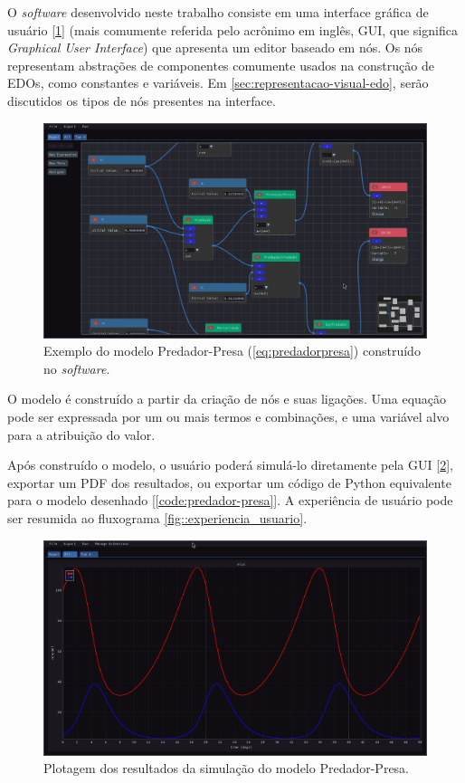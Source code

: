 \documentclass[
	12pt,				%
	openright,			%
	oneside,			%
	a4paper,			%
	main=brazil,
	english,			%
	]{ufsj-abntex2}
\begin{document}
O \textit{software} desenvolvido neste trabalho consiste em uma interface gráfica de usuário [\ref{fig:gui-predador-presa}] (mais comumente referida pelo acrônimo em inglês, GUI, que significa \textit{Graphical User Interface}) que apresenta um editor baseado em nós. Os nós representam abstrações de componentes comumente usados na construção de EDOs, como constantes e variáveis. Em \ref{sec:representacao-visual-edo}, serão discutidos os tipos de nós presentes na interface.

\begin{figure}[h]
    \centering
    \includegraphics[width=\textwidth]{imgs/ode-designer/predador-presa.png} 
    \caption{Exemplo do modelo Predador-Presa (\ref{eq:predadorpresa}) construído no \textit{software}.}
    \label{fig:gui-predador-presa}
\end{figure}

O modelo é construído a partir da criação de nós e suas ligações. Uma equação pode ser expressada por um ou mais termos e combinações, e uma variável alvo para a atribuição do valor.

Após construído o modelo, o usuário poderá simulá-lo diretamente pela GUI [\ref{fig:gui-grafico-all}], exportar um PDF dos resultados, ou exportar um código de Python equivalente para o modelo desenhado [\ref{code:predador-presa}]. A experiência de usuário pode ser resumida ao fluxograma \ref{fig::experiencia_usuario}.

\begin{figure}[h]
    \centering
    \includegraphics[width=\textwidth]{imgs/ode-designer/grafico-all.png} 
    \caption{Plotagem dos resultados da simulação do modelo Predador-Presa.}
    \label{fig:gui-grafico-all}
\end{figure}
\end{document}
